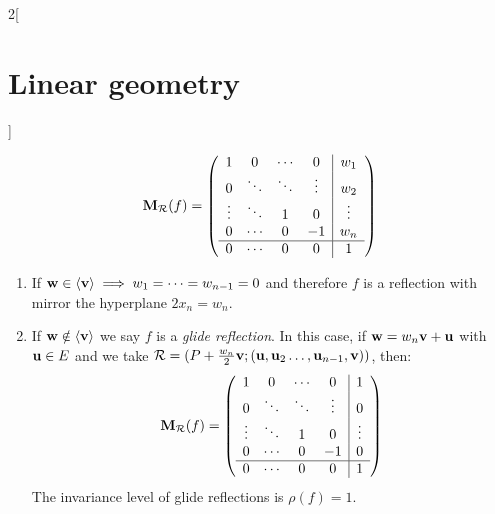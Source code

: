 \documentclass[../../../main_math.tex]{subfiles}
\begin{document}
\begin{multicols}{2}[\section{Linear geometry}]
\begin{proposition}
    $$\boldsymbol{\mathrm{M}}_\mathcal{R}(f)=\left(
      \begin{array}{cccc|c}
          1      & 0      & \cdots & 0      & w_1    \\
          0      & \ddots & \ddots & \vdots & w_2    \\
          \vdots & \ddots & 1      & 0      & \vdots \\
          0      & \cdots & 0      & -1     & w_n    \\
          \hline
          0      & \cdots & 0      & 0      & 1      \\
        \end{array}\right)$$
    \begin{enumerate}
      \item If $\boldsymbol{\mathrm{w}}\in\langle\boldsymbol{\mathrm{v}}\rangle\implies w_1=\cdots =w_{n-1}=0$ and therefore $f$ is a reflection with mirror the hyperplane $2x_n=w_n$.
      \item If $\boldsymbol{\mathrm{w}}\notin\langle\boldsymbol{\mathrm{v}}\rangle$ we say $f$ is a \emph{glide reflection}. In this case, if $\boldsymbol{\mathrm{w}}=w_n\boldsymbol{\mathrm{v}}+\boldsymbol{\mathrm{u}}$ with $\boldsymbol{\mathrm{u}}\in E$ and we take $\mathcal{R}=(P+\frac{w_n}{2}\boldsymbol{\mathrm{v}};(\boldsymbol{\mathrm{u}},\boldsymbol{\mathrm{u}}_2\ldots, \boldsymbol{\mathrm{u}}_{n-1},\boldsymbol{\mathrm{v}}))$, then: $$\boldsymbol{\mathrm{M}}_\mathcal{R}(f)=\left(
              \begin{array}{cccc|c}
                  1      & 0      & \cdots & 0      & 1      \\
                  0      & \ddots & \ddots & \vdots & 0      \\
                  \vdots & \ddots & 1      & 0      & \vdots \\
                  0      & \cdots & 0      & -1     & 0      \\
                  \hline
                  0      & \cdots & 0      & 0      & 1      \\
                \end{array}\right)$$ The invariance level of glide reflections is $\rho(f)=1$.
    \end{enumerate}
  \end{proposition}

\end{multicols}
\end{document}
